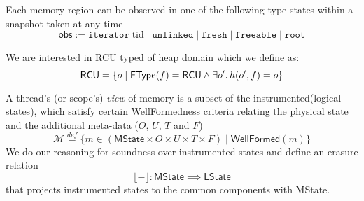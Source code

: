 Each memory region can be observed in one of the following type states within a snapshot taken at any time
\[\textsf{obs} := \texttt{iterator} \; \mathrm{tid} \mid \texttt{unlinked} \mid \texttt{fresh} \mid \texttt{freeable} \mid \texttt{root}\]

We are interested in \textsf{RCU} typed of heap domain which we define as:
\[\textsf{RCU} = \{ o \mid \textsf{FType}(f) = \textsf{RCU} \land \exists o' \ldotp h(o',f) = o \}\]

A thread's (or scope's) \emph{view} of memory is a subset of the instrumented(logical states), which satisfy certain \textsf{WellFormed}ness criteria relating the physical state and the additional meta-data ($O$, $U$, $T$ and $F$)
\[\mathcal{M} \stackrel{def}{=} \{ m \in (\textsf{MState} \times O \times U \times T \times F) \mid  \textsf{WellFormed}(m) \} \]
We do our reasoning for soundness over instrumented states and define an erasure relation
\[\lfloor - \rfloor :\mathsf{MState} \implies \textsf{LState}\]
that projects instrumented states to the common components with \textsf{MState}.

